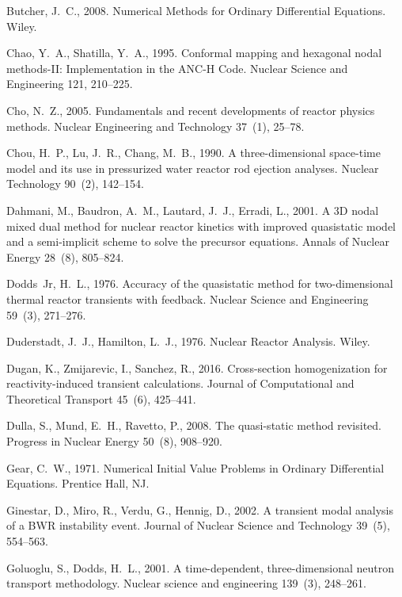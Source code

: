 \documentclass[a4paper]{jpconf}
\begin{document}
\begin{thebibliography}{50}
Butcher, J.~C., 2008. {Numerical Methods for Ordinary Differential Equations}.
  Wiley.

Chao, Y.~A., Shatilla, Y.~A., 1995. Conformal mapping and hexagonal nodal
  methods-{II}: Implementation in the {ANC-H Code}. Nuclear Science and
  Engineering 121, 210--225.

Cho, N.~Z., 2005. Fundamentals and recent developments of reactor physics
  methods. Nuclear Engineering and Technology 37~(1), 25--78.

Chou, H.~P., Lu, J.~R., Chang, M.~B., 1990. A three-dimensional space-time
  model and its use in pressurized water reactor rod ejection analyses. Nuclear
  Technology 90~(2), 142--154.

Dahmani, M., Baudron, A.~M., Lautard, J.~J., Erradi, L., 2001. A {3D} nodal
  mixed dual method for nuclear reactor kinetics with improved quasistatic
  model and a semi-implicit scheme to solve the precursor equations. Annals of
  Nuclear Energy 28~(8), 805--824.

Dodds~Jr, H.~L., 1976. Accuracy of the quasistatic method for two-dimensional
  thermal reactor transients with feedback. Nuclear Science and Engineering
  59~(3), 271--276.

Duderstadt, J.~J., Hamilton, L.~J., 1976. Nuclear Reactor Analysis. Wiley.

Dugan, K., Zmijarevic, I., Sanchez, R., 2016. Cross-section homogenization for
  reactivity-induced transient calculations. Journal of Computational and
  Theoretical Transport 45~(6), 425--441.

Dulla, S., Mund, E.~H., Ravetto, P., 2008. The quasi-static method revisited.
  Progress in Nuclear Energy 50~(8), 908--920.

Gear, C.~W., 1971. {Numerical Initial Value Problems in Ordinary Differential
  Equations}. Prentice Hall, NJ.

Ginestar, D., Miro, R., Verdu, G., Hennig, D., 2002. A transient modal analysis
  of a {BWR} instability event. Journal of Nuclear Science and Technology
  39~(5), 554--563.

Goluoglu, S., Dodds, H.~L., 2001. A time-dependent, three-dimensional neutron
  transport methodology. Nuclear science and engineering 139~(3), 248--261.


\end{thebibliography}
\end{document}

